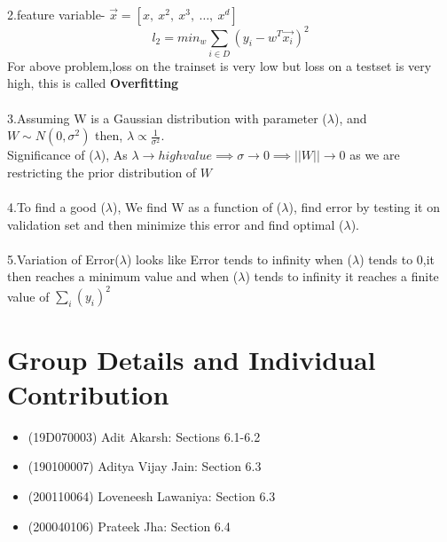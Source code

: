 \documentclass[11pt, twosides]{article}
\begin{document}
2.feature variable- $ \overrightarrow{x} = [x,\ x^2,\ x^3,\ \ldots,\ x^d]$
$$l_2 = min_w \sum_{i \in D} (y_i-w^T\overrightarrow{x_i})^2$$
For above problem,loss on the trainset is very low but loss on a testset is very high, this is called \textbf{Overfitting}\\
\\
3.Assuming W is a Gaussian distribution with parameter ($\lambda$), and $W \sim N(0,\sigma^2)$ then, $\lambda \propto \frac{1}{\sigma^2}$.\\
Significance of ($\lambda$), As $\lambda \rightarrow high value \implies \sigma \rightarrow 0 \implies ||W|| \rightarrow 0$ as we are restricting the prior distribution of $W$\\
\\
4.To find a good ($\lambda$), We find W as a function of ($\lambda$), find error by testing it on validation set and then minimize this error and find optimal ($\lambda$).\\
\\
5.Variation of Error($\lambda$) looks like Error tends to infinity when ($\lambda$) tends to 0,it then reaches a minimum value and when ($\lambda$) tends to infinity it reaches a finite value of $\sum_i (y_i)^2 $

\section{Group Details and Individual Contribution}
\begin{itemize}
    \item (19D070003) Adit Akarsh: Sections 6.1-6.2
    \item (190100007) Aditya Vijay Jain:  Section 6.3
    \item (200110064) Loveneesh Lawaniya: Section 6.3
    \item (200040106) Prateek Jha: Section 6.4
\end{itemize}



\end{document}

